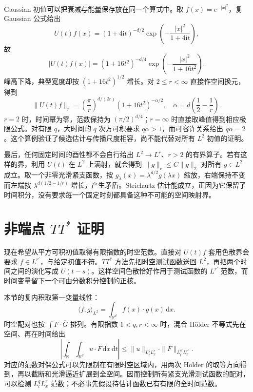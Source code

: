 \ProseParagraphBreak

Gaussian 初值可以把衰减与能量保存放在同一个算式中。取 \(f(x)=e^{-|x|^2}\)，复 Gaussian 公式给出
\[
 U(t)f(x)=(1+4\mathrm it)^{-d/2}
        \exp\left(-\frac{|x|^2}{1+4\mathrm it}\right),
\]
故
\[
 |U(t)f(x)|=(1+16t^2)^{-d/4}
        \exp\left(-\frac{|x|^2}{1+16t^2}\right).
\]
峰高下降，典型宽度却按 \((1+16t^2)^{1/2}\) 增长。对 \(2\leq r<\infty\) 直接作空间换元，得到
\[
 \|U(t)f\|_r
 =\left(\frac\pi r\right)^{d/(2r)}
        (1+16t^2)^{-\alpha/2},
 \quad \alpha=d\left(\frac12-\frac1r\right).
\]
\(r=2\) 时，时间幂为零，范数保持为 \((\pi/2)^{d/4}\)；\(r=\infty\) 时直接取峰值得到相应极限公式。对有限 \(q\)，大时间的 \(q\) 次方可积要求 \(q\alpha>1\)，而可容许关系给出 \(q\alpha=2\)。这个算例验证了候选估计与传播尺度相容，尚不能代替对所有 \(L^2\) 初值的证明。

\ProseParagraphBreak

最后，任何固定时间的酉性都不会自行给出 \(L^2\to L^r\)、\(r>2\) 的有界算子。若有这样的界，利用 \(U(t)\) 在 \(L^2\) 上满射，就会得到 \(\|g\|_r\leq C\|g\|_2\) 对所有 \(g\in L^2\) 成立。取一个非零光滑紧支函数，按 \(g_\lambda(x)=\lambda^{d/2}g(\lambda x)\) 缩放，右端保持不变而左端按 \(\lambda^{d(1/2-1/r)}\) 增长，产生矛盾。Strichartz 估计能成立，正因为它保留了时间积分，没有要求每一个固定时刻都具备这种不可能的空间映射界。

\section{非端点 \texorpdfstring{\(TT^*\)}{TT*} 证明}
\label{b2:sec:app-E-2}

现在希望从平方可积初值取得有限指数的时空范数。直接对 \(U(t)f\) 套用色散界会要求 \(f\in L^{r'}\)，与给定初值不符。\(TT^*\) 方法先把时空测试函数送回 \(L^2\)，再把两个时间之间的演化写成 \(U(t-s)\)。这样空间色散恰好作用于测试函数的 \(L^{r'}\) 范数，而时间变量留下一个可由分数积分控制的正核。

\ProseParagraphBreak

本节的复内积取第一变量线性：
\[
 \langle f,g\rangle_{L^2}
 =\int_{\mathbb R^d}f(x)\cdot\overline{g(x)}\,\mathrm dx.
\]
时空配对也按 \(\int F\cdot\overline G\) 排列。有限指数 \(1<q,r<\infty\) 时，混合 Hölder 不等式先在空间、再在时间给出
\[
 \left|\int_{\mathbb R}\int_{\mathbb R^d}
                u\cdot\overline F\,\mathrm dx\,\mathrm dt\right|
 \leq\|u\|_{L^q_tL^r_x}\cdot\|F\|_{L^{q'}_tL^{r'}_x}.
\]
对应的范数对偶公式可以先限制在有限时空区域内，用两次 Hölder 的取等方向得到，再以截断和光滑逼近扩展到全空间。因而控制所有紧支光滑测试函数的配对，可以检测 \(L^q_tL^r_x\) 范数；不必事先假设待估计函数已有有限的全时间范数。

